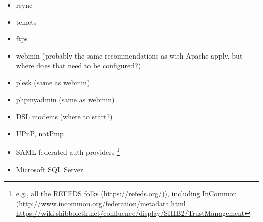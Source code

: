 \begin{itemize}
\item rsync 
\item telnets 
\item ftps 
\item webmin (probably the same recommendations as with Apache apply, but where does that need to be configured?)
\item plesk (same as webmin)
\item phpmyadmin (same as webmin)
\item DSL modems (where to start?)
\item UPnP, natPmp 
\item SAML federated auth providers \footnote{e.g., all the REFEDS folks (\url{https://refeds.org/})), including InCommon (\url{http://www.incommon.org/federation/metadata.html}
  \url{https://wiki.shibboleth.net/confluence/display/SHIB2/TrustManagement} }
\item Microsoft SQL Server
\end{itemize}

